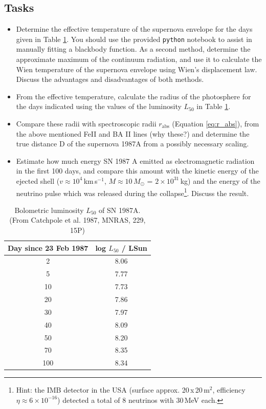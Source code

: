 \documentclass{article}
\begin{document}
\clearpage
\subsection{Tasks}
\begin{itemize}
    \item Determine the effective temperature of the supernova envelope for the days given in Table \ref{tab:l_bol}.
    You should use the provided \texttt{python} notebook to assist in manually fitting a blackbody function.
    As a second method, determine the approximate maximum of the continuum radiation, and use it to calculate the Wien temperature of the supernova envelope using Wien's displacement law.
    Discuss the advantages and disadvantages of both methods.
    \item From the effective temperature, calculate the radius of the photosphere for the days indicated using the values of the luminosity $L_{50}$ in Table \ref{tab:l_bol}.
    \item Compare these radii with spectroscopic radii $r_\text{abs}$ (Equation \ref{eq:r_abs}), from the above mentioned FeII and BA II lines (why these?) and determine the true distance D of the supernova 1987A from a possibly necessary scaling.
    \item Estimate how much energy SN 1987 A emitted as electromagnetic radiation in the first 100 days, and compare this amount with the kinetic energy of the ejected shell ($v \approx 10^4$\,km\,s$^{-1}$, $M \approx 10\,M_\odot$ = $2 \times 10^{31}$\,kg) and the energy of the neutrino pulse which was released during the collapse\footnote{Hint: the IMB detector in the USA (surface approx. 20\,x\,20\,m$^2$, efficiency $\eta \approx 6 \times 10^{-16}$) detected a total of 8 neutrinos with 30\,MeV each.}.
    Discuss the result.
\end{itemize}

\begin{table}[htb]
    \caption{Bolometric luminosity $L_{50}$ of SN 1987A. (From Catchpole et al. 1987, MNRAS, 229, 15P)}
    \vspace{0.2cm}
    \centering
    \begin{tabular}{c|c}
         Day since 23 Feb 1987 & log $L_{50}$ / LSun \\ \hline
         2 & 8.06 \\
         5 & 7.77 \\
        10 & 7.73 \\
        20 & 7.86 \\
        30 & 7.97 \\
        40 & 8.09 \\
        50 & 8.20 \\
        70 & 8.35 \\
       100 & 8.34 \\
    \end{tabular}
    
    \label{tab:l_bol}
\end{table}
\end{document}
